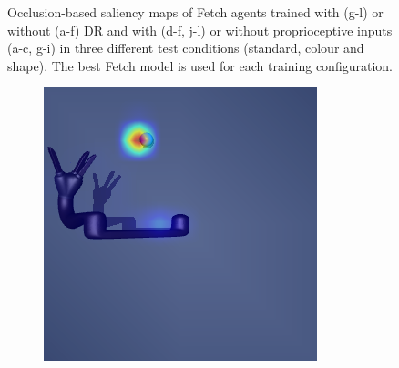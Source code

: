 \begin{figure}[h!]
\begin{subfigure}{0.24\columnwidth}
  \end{subfigure}
  \caption{Occlusion-based saliency maps of Fetch agents trained with (g-l) or without (a-f) DR and with (d-f, j-l) or without proprioceptive inputs (a-c, g-i) in three different test conditions (standard, colour and shape). The best Fetch model is used for each training configuration.}
  \label{fig:saliency_fetch_distractor}
\end{figure}

\begin{figure}[h!]
  \centering
  \begin{subfigure}{0.24\columnwidth}
    \includegraphics[width=\linewidth]{figures/chapter6/distractor_saliency_jaco_pro_off/standard_visual_std}
  \end{subfigure}
  \begin{subfigure}{0.24\columnwidth}

\end{subfigure}
\end{figure}
